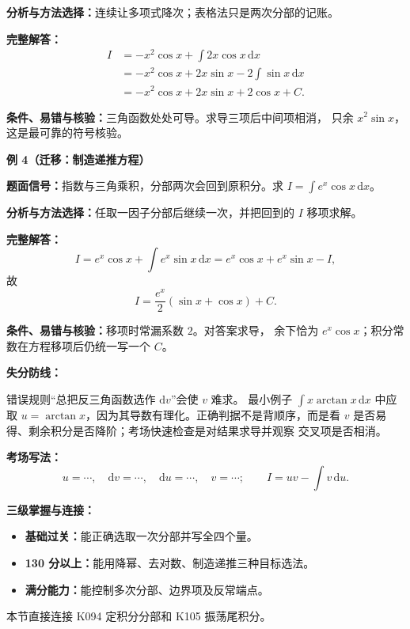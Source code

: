 \begin{knowledgeBox}
\textbf{分析与方法选择：}连续让多项式降次；表格法只是两次分部的记账。

\textbf{完整解答：}
\[
\begin{aligned}
I&=-x^2\cos x+\int2x\cos x\,\mathrm dx\\
&=-x^2\cos x+2x\sin x-2\int\sin x\,\mathrm dx\\
&=-x^2\cos x+2x\sin x+2\cos x+C.
\end{aligned}
\]

\textbf{条件、易错与核验：}三角函数处处可导。求导三项后中间项相消，
只余 \(x^2\sin x\)，这是最可靠的符号核验。

\textbf{例 4（迁移：制造递推方程）}

\textbf{题面信号：}指数与三角乘积，分部两次会回到原积分。求
\(I=\int e^x\cos x\,\mathrm dx\)。

\textbf{分析与方法选择：}任取一因子分部后继续一次，并把回到的 \(I\)
移项求解。

\textbf{完整解答：}
\[
I=e^x\cos x+\int e^x\sin x\,\mathrm dx
=e^x\cos x+e^x\sin x-I,
\]
故
\[
\boxed{I=\frac{e^x}{2}(\sin x+\cos x)+C.}
\]

\textbf{条件、易错与核验：}移项时常漏系数 \(2\)。对答案求导，
余下恰为 \(e^x\cos x\)；积分常数在方程移项后仍统一写一个 \(C\)。

\textbf{失分防线：}

错误规则“总把反三角函数选作 \(\mathrm dv\)”会使 \(v\) 难求。
最小例子 \(\int x\arctan x\,\mathrm dx\) 中应取
\(u=\arctan x\)，因为其导数有理化。正确判据不是背顺序，而是看
\(v\) 是否易得、剩余积分是否降阶；考场快速检查是对结果求导并观察
交叉项是否相消。

\textbf{考场写法：}
\[
u=\cdots,\quad \mathrm dv=\cdots,\quad
\mathrm du=\cdots,\quad v=\cdots;
\qquad
I=uv-\int v\,\mathrm du.
\]

\textbf{三级掌握与连接：}
\begin{itemize}
  \item \textbf{基础过关：}能正确选取一次分部并写全四个量。
  \item \textbf{130 分以上：}能用降幂、去对数、制造递推三种目标选法。
  \item \textbf{满分能力：}能控制多次分部、边界项及反常端点。
\end{itemize}
本节直接连接 K094 定积分分部和 K105 振荡尾积分。
\end{knowledgeBox}


\par

